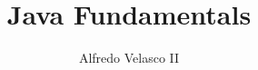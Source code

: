 \documentclass{book}
\title{Java Fundamentals}
\author{Alfredo Velasco II}
\begin{document}
\maketitle











\printglossaries
\end{document}
